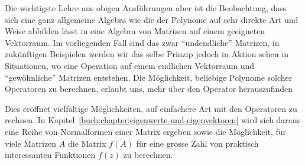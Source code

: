 Die wichtigste Lehre aus obigen Ausführungen aber ist
die Beobachtung, dass sich eine ganz allgemeine Algebra
wie die der Polynome auf sehr direkte Art und Weise 
abbilden lässt in eine Algebra von Matrizen auf einem
geeigneten Vektorraum.
Im vorliegenden Fall sind das zwar ``undendliche''
Matrizen, in zukünftigen Beispielen werden wir das
selbe Prinzip jedoch in Aktion sehen in Situationen,
wo eine Operation auf einem endlichen Vektorraum
und ``gewöhnliche'' Matrizen entstehen.
Die Möglichkeit, beliebige Polynome solcher Operatoren
zu berechnen, erlaubt uns, mehr über den Operator 
herauszufinden

Dies eröffnet vielfältige Möglichkeiten, auf einfachere
Art mit den Operatoren zu rechnen.
In Kapitel~\ref{buch:chapter:eigenwerte-und-eigenvektoren}
wird sich daraus eine Reihe von Normalformen einer Matrix
ergeben sowie die Möglichkeit, für viele Matrizen $A$
die Matrix $f(A)$ für eine grosse Zahl von praktisch
interessanten Funktionen $f(z)$ zu berechnen.

